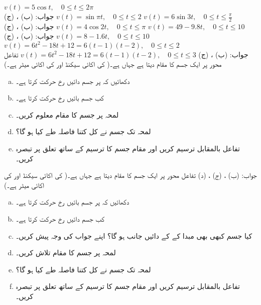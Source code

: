 $v(t)=5\cos t,\quad 0\le t\le 2\pi$\\
جواب:\quad
(ب) ، (ج) 
$v(t)=\sin \pi t,\quad 0\le t\le 2$
$v(t)=6\sin 3t,\quad 0\le t\le \tfrac{\pi}{2}$\\
جواب:\quad
(ب) ، (ج) 
$v(t)=4\cos 2t,\quad 0\le t\le \pi$
$v(t)=49-9.8t,\quad 0\le t\le 10$\\
جواب:\quad
(ب) ، (ج) 
$v(t)=8-1.6t,\quad 0\le t\le 10$
$v(t)=6t^2-18t+12=6(t-1)(t-2),\quad 0\le t\le 2$\\
جواب:\quad
(ب) ، (ج) 
$v(t)=6t^2-18t+12=6(t-1)(t-2),\quad 0\le t\le 3$
تفاعل  محور  پر ایک جسم کا مقام دیتا ہے جہاں  ہے۔( کی اکائی سیکنڈ  اور  کی اکائی میٹر  ہے۔)
\begin{enumerate}[a.]
\item
دکھائیں کہ  پر جسم دائیں رخ حرکت کرتا ہے۔
\item
کب جسم بائیں رخ حرکت کرتا ہے۔
\item
لمحہ  پر جسم کا مقام معلوم کریں۔
\item
لمحہ  تک جسم نے کل کتنا فاصلہ طے کیا ہو گا؟
\item
تفاعل  بالمقابل  ترسیم کریں اور مقام جسم کا ترسیم کے ساتھ تعلق پر تبصرہ کریں۔
\end{enumerate}
جواب:\quad
(ب) ، (ج) ، (د) 
تفاعل  محور  پر ایک جسم کا مقام دیتا ہے جہاں  ہے۔( کی اکائی سیکنڈ  اور  کی اکائی میٹر  ہے۔)
\begin{enumerate}[a.]
\item
دکھائیں کہ  پر جسم بائیں رخ حرکت کرتا ہے۔
\item
کب جسم دائیں رخ حرکت کرتا ہے۔
\item
کیا جسم کبھی بھی مبدا کے کے دائیں جانب ہو گا؟ اپنے جواب کی وجہ پیش کریں۔
\item
لمحہ  پر جسم کا مقام تلاش کریں۔
\item
لمحہ  تک جسم نے کل کتنا فاصلہ طے کیا ہو گا؟
\item
تفاعل  بالمقابل  ترسیم کریں اور مقام جسم کا ترسیم کے ساتھ تعلق پر تبصرہ کریں۔
\end{enumerate}
